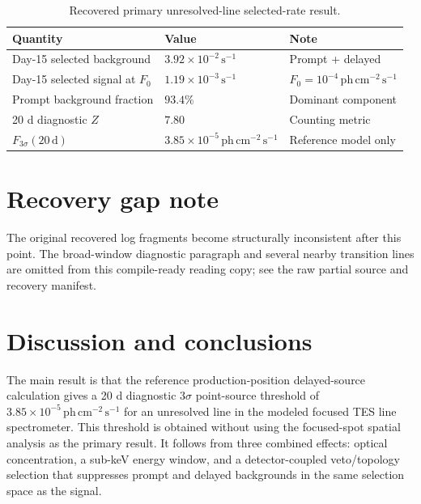 \documentclass[11pt]{article}
\newcommand{\phcms}{\ensuremath{\,\mathrm{ph\,cm^{-2}\,s^{-1}}}}
\newcommand{\cps}{\ensuremath{\,\mathrm{s^{-1}}}}
\newcommand{\fzero}{F_{0}}
\newcommand{\fthree}{F_{3\sigma}}
\begin{document}
\begin{table}[h]
\centering
\caption{Recovered primary unresolved-line selected-rate result.}
\label{tab:primary_sensitivity}
\begin{tabular}{lll}
\toprule
Quantity & Value & Note \\
\midrule
Day-15 selected background & $3.92\times10^{-2}\cps$ & Prompt + delayed \\
Day-15 selected signal at $\fzero$ & $1.19\times10^{-3}\cps$ & $\fzero=10^{-4}\phcms$ \\
Prompt background fraction & $93.4\%$ & Dominant component \\
20 d diagnostic $Z$ & $7.80$ & Counting metric \\
$\fthree(20\,\mathrm{d})$ & $3.85\times10^{-5}\phcms$ & Reference model only \\
\bottomrule
\end{tabular}
\end{table}

\clearpage
\section*{Recovery gap note}
The original recovered log fragments become structurally inconsistent after this point. The broad-window diagnostic paragraph and several nearby transition lines are omitted from this compile-ready reading copy; see the raw partial source and recovery manifest.

\section{Discussion and conclusions}
\label{sec:discussion}

The main result is that the reference production-position delayed-source calculation gives a 20 d diagnostic $3\sigma$ point-source threshold of $3.85\times10^{-5}\phcms$ for an unresolved line in the modeled focused TES line spectrometer. This threshold is obtained without using the focused-spot spatial analysis as the primary result. It follows from three combined effects: optical concentration, a sub-keV energy window, and a detector-coupled veto/topology selection that suppresses prompt and delayed backgrounds in the same selection space as the signal.
\end{document}
